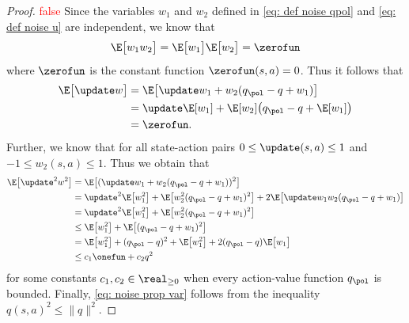 \begin{proof}
\textcolor{red}{false}
Since the variables $w_1$ and $w_2$ defined in \eqref{eq: def noise qpol} and \eqref{eq: def noise u} are independent, we know that
\begin{align*}
    \E \big[ w_1 w_2 \big]
    =     \E \big[ w_1 \big]  \E \big[ w_2 \big] = \zerofun 
\end{align*}
where $\zerofun$ is the constant function $\zerofun(s,a) = 0$.
Thus it follows that
\begin{align*}
    \E \big[ \update w \big] 
    &= \E \big[ \update w_1 + w_2 ( q_\pol - q + w_1 ) \big] 
    \\
    &= \update \E[w_1] + \E [w_2] \big( q_\pol - q + \E[ w_1 ] \big) 
    \\
    &= \zerofun.
\end{align*}
Further, we know that for all state-action pairs $0 \leq \update(s,a) \leq 1$ and $-1 \leq w_2(s,a) \leq 1$. Thus we obtain that
\begin{align*}
    \E \big[ \update^2 w^2 \big]
    &= \E \big[ ( \update w_1 + w_2 ( q_\pol - q + w_1 ) )^2 \big]
    \\
    &= \update^2 \E \big[ w_1^2 \big] + \E \big[ w_2^2 ( q_\pol - q + w_1 )^2 \big] +  2 \E \big[ \update w_1 w_2 ( q_\pol - q + w_1 ) \big] 
    \\
    &= \update^2 \E \big[ w_1^2 \big] + \E \big[ w_2^2 ( q_\pol - q + w_1 )^2 \big]
    \\
    &\leq \E \big[ w_1^2 \big] + \E \big[ ( q_\pol - q + w_1 )^2 \big]
    \\
    &= \E \big[ w_1^2 \big] + (q_\pol - q)^2 + \E \big[ w_1^2 \big] + 2 (q_\pol - q) \E \big[ w_1 \big]
    \\
    &\leq c_1 \onefun + c_2 q^2
\end{align*}
for some constants $c_1, c_2 \in \real_{\geq 0}$ when every action-value function $q_\pol$ is bounded.
Finally, \eqref{eq: noise prop var} follows from the inequality $q(s,a)^2 \leq \|q\|^2$.
\end{proof}